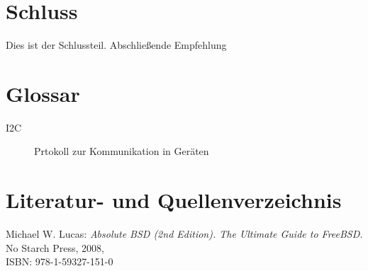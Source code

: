 \documentclass[a4paper,12pt]{scrartcl}
\begin{document}

\clearpage
\section{Schluss}
Dies ist der Schlussteil. Abschlie\ss{}ende Empfehlung

\clearpage
\section{Glossar}
\begin{description}
 \item[I2C] Prtokoll zur Kommunikation in Ger\"aten
\end{description}

\clearpage
\section{Literatur- und Quellenverzeichnis}

\renewcommand\refname{Literaturverzeichnis}
\begin{thebibliography}{999}

Michael W. Lucas:  {\sl Absolute BSD (2nd Edition). The Ultimate Guide to FreeBSD.} No Starch Press, 2008,
\\ISBN: 978-1-59327-151-0

\end{thebibliography}
\end{document}
